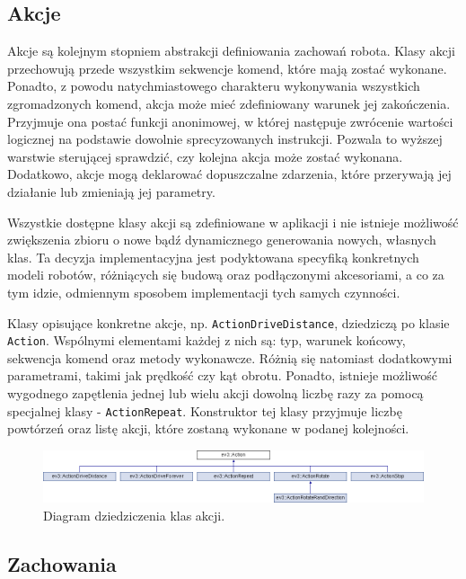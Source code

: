 \subsection{Akcje}
\indent \indent Akcje są kolejnym stopniem abstrakcji definiowania zachowań robota. Klasy akcji przechowują przede wszystkim sekwencje komend, które mają zostać wykonane. Ponadto, z powodu natychmiastowego charakteru wykonywania wszystkich zgromadzonych komend, akcja może mieć zdefiniowany warunek jej zakończenia. Przyjmuje ona postać funkcji anonimowej, w której następuje zwrócenie wartości logicznej na podstawie dowolnie sprecyzowanych instrukcji. Pozwala to wyższej warstwie sterującej sprawdzić, czy kolejna akcja może zostać wykonana. Dodatkowo, akcje mogą deklarować dopuszczalne zdarzenia, które przerywają jej działanie lub zmieniają jej parametry.

Wszystkie dostępne klasy akcji są zdefiniowane w aplikacji i nie istnieje możliwość zwiększenia zbioru o nowe bądź dynamicznego generowania nowych, własnych klas. Ta decyzja implementacyjna jest podyktowana specyfiką konkretnych modeli robotów, różniących się budową oraz podłączonymi akcesoriami, a co za tym idzie, odmiennym sposobem implementacji tych samych czynności.

Klasy opisujące konkretne akcje, np. {\tt ActionDriveDistance}, dziedziczą po klasie {\tt Action}. Wspólnymi elementami każdej z nich są: typ, warunek końcowy, sekwencja komend oraz metody wykonawcze. Różnią się natomiast dodatkowymi parametrami, takimi jak prędkość czy kąt obrotu. Ponadto, istnieje możliwość wygodnego zapętlenia jednej lub wielu akcji dowolną liczbę razy za pomocą specjalnej klasy - {\tt ActionRepeat}. Konstruktor tej klasy przyjmuje liczbę powtórzeń oraz listę akcji, które zostaną wykonane w podanej kolejności.

\begin{figure}[!ht]
    \centering
        \includegraphics[width=1\textwidth]{diagrams/action_class.png}
    \caption{Diagram dziedziczenia klas akcji.\label{fig:action_class}}
\end{figure}

\subsection{Zachowania}

